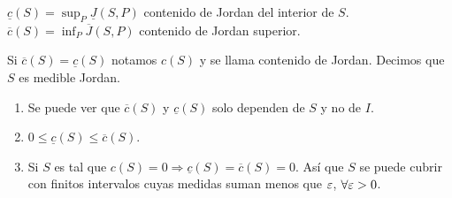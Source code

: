 \begin{definition}
  \(\underline{c}(S) = \sup_P \underline{J}(S, P)\) contenido de Jordan del interior de \(S\).
  \(\overline{c}(S) = \inf_P \overline{J}(S, P)\) contenido de Jordan superior.
\end{definition}

\clearpage

\begin{definition}
  Si \(\overline{c}(S) = \underline{c}(S)\) notamos \(c(S)\) y se llama contenido de Jordan. Decimos que \(S\) es medible Jordan.
\end{definition}

\begin{note}
  \begin{enumerate}
    \item Se puede ver que \(\overline{c}(S)\) y \(\underline{c}(S)\) solo dependen de \(S\) y no de \(I\).
    \item \(0 \leq \underline{c}(S) \leq \overline{c}(S)\).
    \item Si \(S\) es tal que \(c(S) = 0 \Rightarrow \underline{c}(S) = \overline{c}(S) = 0\). Así que \(S\) se puede cubrir con finitos intervalos cuyas medidas suman menos que \(\varepsilon \), \(\forall \varepsilon > 0\).
  \end{enumerate}
\end{note}
